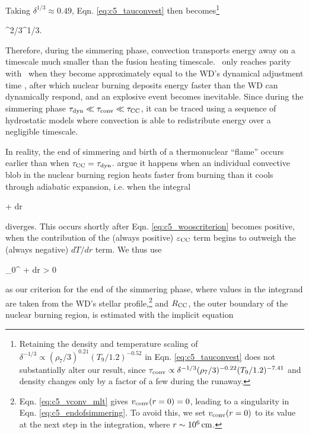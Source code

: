 \noindent Taking $\delta^{1/3} \approx 0.49$, Eqn. \ref{eq:c5_tauconvest} then becomes\footnote{Retaining the density and temperature scaling of $\delta^{-1/3} \propto (\rho_7/3)^{0.21}(T_9/1.2)^{-0.52}$ in Eqn. \ref{eq:c5_tauconvest} does not substantially alter our result, since $\tauconv \propto \delta^{-1/3}(\rho_7/3)^{-0.22}(T_9/1.2)^{-7.41}$ and density changes only by a factor of a few during the runaway.}

\eqbegin
\tauconv {}\taudyn^{2/3}\taucc^{1/3}.
\label{eq:c5_tauconvest2}
\eqend

Therefore, during the simmering phase, convection transports energy away on a timescale much smaller than the fusion heating timescale.  \taucc\ only reaches parity with \tauconv\ when they become approximately equal to the WD's dynamical adjustment time \taudyn, after which nuclear burning deposits energy faster than the WD can dynamically respond, and an explosive event becomes inevitable.  Since during the simmering phase $\taudyn \ll \tauconv \ll \taucc$, it can be traced using a sequence of hydrostatic models where convection is able to redistribute energy over a negligible timescale.

In reality, the end of simmering and birth of a thermonuclear ``flame'' occurs earlier than when $\taucc = \taudyn$.  \citeal{wooswk04} argue it happens when an individual convective blob in the nuclear burning region heats faster from burning than it cools through adiabatic expansion, i.e. when the integral

\eqbegin
\int{} + dr
\label{eq:c5_wooscriterion}
\eqend

\noindent diverges.  This occurs shortly after Eqn. \ref{eq:c5_wooscriterion} becomes positive, when the contribution of the (always positive) $\epscc$ term begins to outweigh the (always negative) $dT/dr$ term.  We thus use

\eqbegin
\int_0^{\Rcc} + dr > 0
\label{eq:c5_endofsimmering}
\eqend

\noindent as our criterion for the end of the simmering phase, where values in the integrand are taken from the WD's stellar profile,\footnote{Eqn. \ref{eq:c5_vconv_mlt} gives $\vconv(r = 0) = 0$, leading to a singularity in Eqn. \ref{eq:c5_endofsimmering}.  To avoid this, we set $\vconv(r = 0)$ to its value at the next step in the integration, where $r \sim 10^6\,\mathrm{cm}$.} and $\Rcc$, the outer boundary of the nuclear burning region, is estimated with the implicit equation

